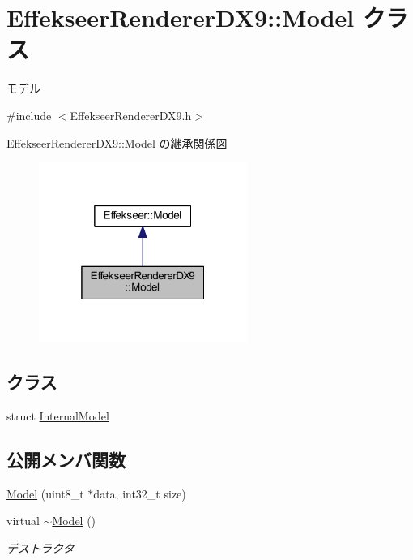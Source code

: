 \hypertarget{class_effekseer_renderer_d_x9_1_1_model}{}\section{Effekseer\+Renderer\+D\+X9\+:\+:Model クラス}
\label{class_effekseer_renderer_d_x9_1_1_model}


モデル  




{\ttfamily \#include $<$Effekseer\+Renderer\+D\+X9.\+h$>$}



Effekseer\+Renderer\+D\+X9\+:\+:Model の継承関係図\nopagebreak
\begin{figure}[H]
\begin{center}
\leavevmode
\includegraphics[width=193pt]{class_effekseer_renderer_d_x9_1_1_model__inherit__graph}
\end{center}
\end{figure}
\subsection*{クラス}
\begin{DoxyCompactItemize}
\item 
struct \mbox{\hyperlink{struct_effekseer_renderer_d_x9_1_1_model_1_1_internal_model}{Internal\+Model}}
\end{DoxyCompactItemize}
\subsection*{公開メンバ関数}
\begin{DoxyCompactItemize}
\item 
\mbox{\hyperlink{class_effekseer_renderer_d_x9_1_1_model_a2cc666c9789232bbe6bb09e5cf3fad6a}{Model}} (uint8\+\_\+t $\ast$data, int32\+\_\+t size)
\item 
virtual \mbox{\hyperlink{class_effekseer_renderer_d_x9_1_1_model_a5878dbe0a5971ffb28d6c1af347c6e87}{$\sim$\+Model}} ()
\begin{DoxyCompactList}\small\item\em デストラクタ \end{DoxyCompactList}\end{DoxyCompactItemize}
